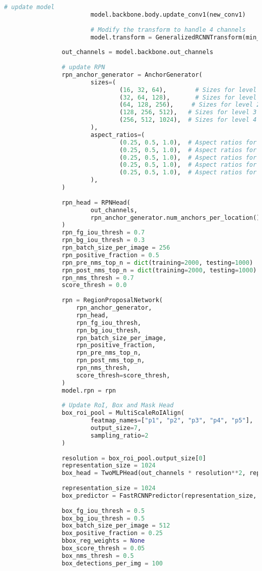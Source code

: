 \begin{lstlisting}[language=Python,caption=Random Augmentation of the Background using cv2 in Python, label=lst:bg-augmentation]
						# update model
						model.backbone.body.update_conv1(new_conv1)
						
						# Modify the transform to handle 4 channels
						model.transform = GeneralizedRCNNTransform(min_size, max_size, image_mean, image_std)
				
				out_channels = model.backbone.out_channels
				
				# update RPN
				rpn_anchor_generator = AnchorGenerator(
						sizes=(
								(16, 32, 64),        # Sizes for level 0
								(32, 64, 128),       # Sizes for level 1
								(64, 128, 256),     # Sizes for level 2
								(128, 256, 512),   # Sizes for level 3
								(256, 512, 1024),  # Sizes for level 4
						),
						aspect_ratios=(
								(0.25, 0.5, 1.0),  # Aspect ratios for level 0
								(0.25, 0.5, 1.0),  # Aspect ratios for level 1
								(0.25, 0.5, 1.0),  # Aspect ratios for level 2
								(0.25, 0.5, 1.0),  # Aspect ratios for level 3
								(0.25, 0.5, 1.0),  # Aspect ratios for level 4
						),
				)
				
				rpn_head = RPNHead(
						out_channels, 
						rpn_anchor_generator.num_anchors_per_location()[0]
				)
				rpn_fg_iou_thresh = 0.7
				rpn_bg_iou_thresh = 0.3
				rpn_batch_size_per_image = 256
				rpn_positive_fraction = 0.5
				rpn_pre_nms_top_n = dict(training=2000, testing=1000)
				rpn_post_nms_top_n = dict(training=2000, testing=1000)
				rpn_nms_thresh = 0.7
				score_thresh = 0.0
				
				rpn = RegionProposalNetwork(
					rpn_anchor_generator,
					rpn_head,
					rpn_fg_iou_thresh,
					rpn_bg_iou_thresh,
					rpn_batch_size_per_image,
					rpn_positive_fraction,
					rpn_pre_nms_top_n,
					rpn_post_nms_top_n,
					rpn_nms_thresh,
					score_thresh=score_thresh,
				)
				model.rpn = rpn
				
				# Update RoI, Box and Mask Head
				box_roi_pool = MultiScaleRoIAlign(
						featmap_names=["p1", "p2", "p3", "p4", "p5"], 
						output_size=7, 
						sampling_ratio=2
				)
				
				resolution = box_roi_pool.output_size[0]
				representation_size = 1024
				box_head = TwoMLPHead(out_channels * resolution**2, representation_size)
				
				representation_size = 1024
				box_predictor = FastRCNNPredictor(representation_size, 2)
				
				box_fg_iou_thresh = 0.5
				box_bg_iou_thresh = 0.5
				box_batch_size_per_image = 512
				box_positive_fraction = 0.25
				bbox_reg_weights = None
				box_score_thresh = 0.05
				box_nms_thresh = 0.5
				box_detections_per_img = 100
				

\end{lstlisting}

